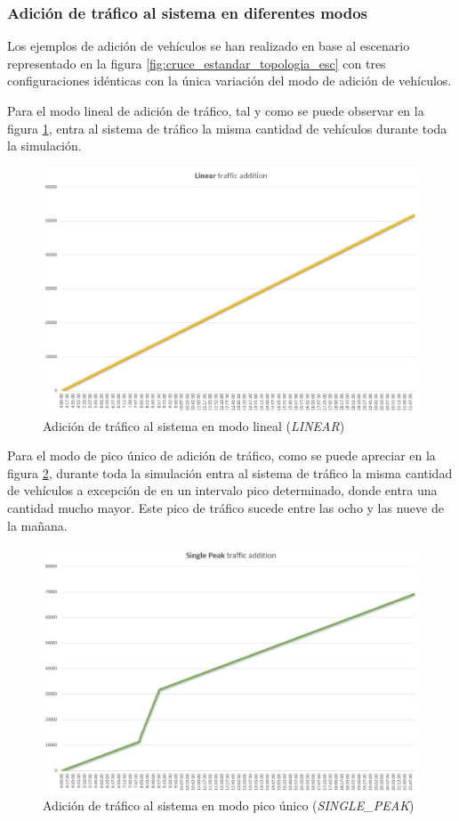 \subsubsection{Adición de tráfico al sistema en diferentes modos}
    \label{subsubsection:adicion_trafico}
Los ejemplos de adición de vehículos se han realizado en base al escenario representado en la figura \ref{fig:cruce_estandar_topologia_esc} con tres configuraciones idénticas con la única variación del modo de adición de vehículos.


Para el modo lineal de adición de tráfico, tal y como se puede observar en la figura \ref{fig:adicion_trafico_lineal}, entra al sistema de tráfico la misma cantidad de vehículos durante toda la simulación.
\begin{figure}[H]
    \centering
    \includegraphics[width=0.81\linewidth]{text/image/Linear.png}
    \caption{Adición de tráfico al sistema en modo lineal (\textit{LINEAR})}
    \label{fig:adicion_trafico_lineal}
\end{figure}

Para el modo de pico único de adición de tráfico, como se puede apreciar en la figura \ref{fig:adicion_trafico_single_peak}, durante toda la simulación entra al sistema de tráfico la misma cantidad de vehículos a excepción de en un intervalo pico determinado, donde entra una cantidad
mucho mayor. Este pico de tráfico sucede entre las ocho y las nueve de la mañana.
\begin{figure}[H]
    \centering
    \includegraphics[width=1\linewidth]{text/image/SinglePeak.png}
    \caption{Adición de tráfico al sistema en modo pico único (\textit{SINGLE\_PEAK})}
    \label{fig:adicion_trafico_single_peak}
\end{figure}

